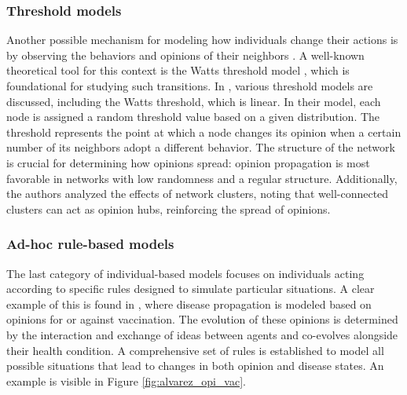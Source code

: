\subsubsection{Threshold models}
Another possible mechanism for modeling how individuals change their actions is by observing the behaviors and opinions of their neighbors \cite{Granovetter_1978, Krassa_1988}. A well-known theoretical tool for this context is the Watts threshold model \cite{Watts_2002}, which is foundational for studying such transitions.
In \cite{Wang_2019}, various threshold models are discussed, including the Watts threshold, which is linear. In their model, each node is assigned a random threshold value based on a given distribution. The threshold represents the point at which a node changes its opinion when a certain number of its neighbors adopt a different behavior. The structure of the network is crucial for determining how opinions spread: opinion propagation is most favorable in networks with low randomness and a regular structure. Additionally, the authors analyzed the effects of network clusters, noting that well-connected clusters can act as opinion hubs, reinforcing the spread of opinions.

\subsubsection{Ad-hoc rule-based models}
The last category of individual-based models focuses on individuals acting according to specific rules designed to simulate particular situations. A clear example of this is found in \cite{Alvarez_Zuzek_2017}, where disease propagation is modeled based on opinions for or against vaccination. The evolution of these opinions is determined by the interaction and exchange of ideas between agents and co-evolves alongside their health condition. A comprehensive set of rules is established to model all possible situations that lead to changes in both opinion and disease states. An example is visible in Figure \ref{fig:alvarez_opi_vac}.


